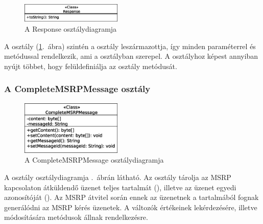 \begin{figure}
  \vspace{-15pt}
  \begin{center}
    \includegraphics[width=0.43\textwidth]{img/class_diagrams/Response.eps}
  \end{center}
  \vspace{-15pt}
  \captionsetup{font=scriptsize}
  \caption{A Response osztálydiagramja}
   \label{fig:class_response}
  \vspace{-10pt}
\end{figure}
A  osztály (\ref{fig:class_response}.~ábra) szintén a  osztály leszármazottja, így minden paraméterrel és metódussal rendelkezik, ami a  osztályban szerepel. A  osztályhoz képest annyiban nyújt többet, hogy felüldefiniálja az osztály  metódusát.

\newpage
\subsubsection*{A CompleteMSRPMessage osztály}
\label{sec:msrp_completmsrpemessage}

\begin{figure}
  \vspace{-15pt}
  \begin{center}
    \includegraphics[width=0.43\textwidth]{img/class_diagrams/CompleteMSRPMessage.eps}
  \end{center}
  \vspace{-15pt}
  \captionsetup{font=scriptsize}
  \caption{A CompleteMSRPMessage osztálydiagramja}
   \label{fig:class_completmsrpemessage}
  \vspace{-10pt}
\end{figure}
A  osztály osztálydiagramja .~ábrán látható. Az osztály tárolja az MSRP kapcsolaton átküldendő üzenet teljes tartalmát (), illetve az üzenet egyedi azonosítóját (). Az MSRP átvitel során ennek az üzenetnek a tartalmából fognak generálódni az MSRP kérés üzenetek. A változók értékeinek lekérdezésére, illetve módosítására metódusok állnak rendelkezésre.


